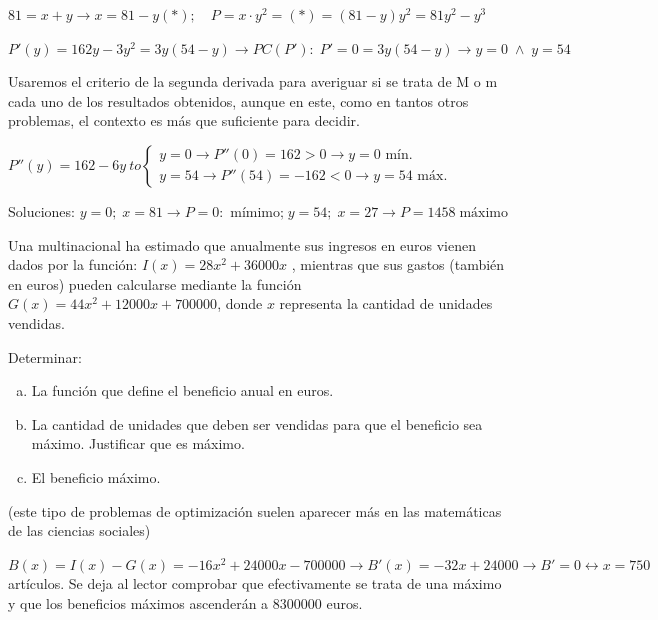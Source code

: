 	\begin{proofw}\renewcommand{\qedsymbol}{$\diamond$}
	
	$81=x+y \to x=81-y (*); \quad P=x\cdot y^2=(*)=(81-y)y^2=81y^2-y^3$
	
	$P'(y)=162y-3y^2=3y(54-y)  \to  PC(P'):\; P'=0=3y(54-y) \to  y=0 \; \wedge \; y=54$
	
	Usaremos el criterio de la segunda derivada para averiguar si se trata de M o m cada uno de los resultados obtenidos, aunque en este, como en tantos otros problemas, el contexto es más que suficiente para decidir.
	
	$P''(y)=162-6y \ to \begin{cases}
 	y=0 \to P''(0)=162>0 \to y=0 \mbox{ mín.} \\
 	y=54 \to P''(54)=-162<0 \to y=54 \mbox{ máx.} 
	 \end{cases}$
	 
	 Soluciones: $y=0; \; x=81 \to P=0: \mbox{ mímimo;} \; y=54; \; x=27 \to P=1458 \; \mbox{máximo}$
	 
	\end{proofw}


	\begin{ejre} Una multinacional ha estimado que anualmente sus ingresos en euros vienen dados por la función: $I(x) = 28x^2 + 36000x$ , mientras que sus gastos (también en euros) pueden calcularse mediante la función $G(x) = 44x^2 + 12000x + 700000$, donde $x$ representa la cantidad de unidades vendidas.
	
	Determinar:
	\begin{enumerate}[a) ]

	\item La función que define el beneficio anual en euros.
	\item La cantidad de unidades que deben ser vendidas para que el beneficio sea máximo. Justificar que es máximo.
	\item El beneficio máximo.

	\end{enumerate}
	
	\vspace{-3mm}
	\textcolor{gris}{(este tipo de problemas de optimización suelen aparecer más en las matemáticas de las ciencias sociales)}
		
	\end{ejre}
	
	\begin{proofw}\renewcommand{\qedsymbol}{$\diamond$}
$B(x)=I(x)-G(x)=-16x^2 + 24000x - 700000 \to  B'(x)=-32x+24000 \to B'=0 \leftrightarrow x=750\;$ artículos. Se deja al lector comprobar que efectivamente se trata de una máximo y que los beneficios máximos ascenderán a  $8300000 $ euros.
	
	\end{proofw}
	
